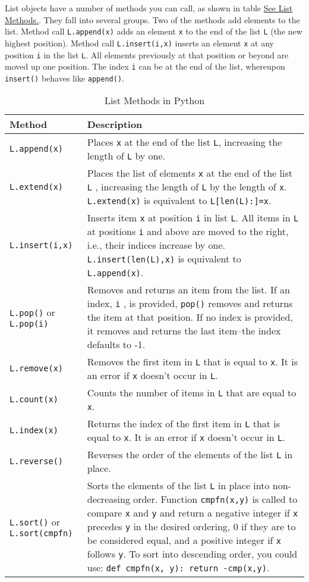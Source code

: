 List objects have a number of
methods you can call, as shown in table \href{chap2.html\#20881}{See List
Methods.}. They fall into several groups. Two of the methods add
elements to the list. Method call \texttt{L.append(x)} adds an element
\texttt{x} to the end of the list \texttt{L} (the new highest position).
Method call \texttt{L.insert(i,x)} inserts an element \texttt{x} at any
position \texttt{i} in the list \texttt{L}. All elements previously at that
position or beyond are moved up one position. The index \texttt{i} can be
at the end of the list, whereupon \texttt{insert()} behaves like
\texttt{append()}.


\begin{longtable}{l|p{7cm}}
\caption{List Methods in Python}
\label{table:list-methods-python}\\
%
\toprule
Method & Description \\
%
\midrule
\verb"L.append(x)" & Places \texttt{x} at the end of the list \texttt{L}, increasing the length of \texttt{L} by one. \\
%
\verb"L.extend(x)" & Places the list of elements \verb"x" at the end of the list \verb"L" , increasing the length of \verb"L" by the length of \verb"x". \verb"L.extend(x)" is equivalent to \verb"L[len(L):]=x". \\
%
\verb"L.insert(i,x)" &  Inserts item \texttt{x} at position \texttt{i} in list \texttt{L}.
All items in \texttt{L} at positions \texttt{i} and above are moved to the right, i.e., their indices increase by one.
\texttt{L.insert(len(L),x)} is equivalent to \texttt{L.append(x)}. \\
%
\verb"L.pop()" or \verb"L.pop(i)" &  Removes and returns an item from the list. If an index, \texttt{i} , is provided, \texttt{pop()} removes and returns the item at that position. If no index is provided, it removes and returns the last item--the index defaults to -1. \\
%
\verb"L.remove(x)" & Removes the first item in \texttt{L} that is equal to \texttt{x}. It is an error if \texttt{x} doesn't occur in \texttt{L}. \\ 
%
\verb"L.count(x)" & Counts the number of items in \texttt{L} that are equal to \texttt{x}. \\
\verb"L.index(x)" & Returns the index of the first item in \texttt{L} that is equal to \texttt{x}. It is an error if \texttt{x} doesn't occur in \texttt{L}. \\
%
\verb"L.reverse()" & Reverses the order of the elements of the list \texttt{L} in place. \\
%
\verb"L.sort()" or \verb"L.sort(cmpfn)" & Sorts the elements of the list  \texttt{L} in place into non- decreasing order. Function \texttt{cmpfn(x,y)} is called to compare \texttt{x} and \texttt{y} and return a negative integer  if \texttt{x} precedes \texttt{y} in the desired ordering, 0 if they are to  be considered equal, and a positive integer if \texttt{x} follows \texttt{y}. To sort into descending order, you could use: \verb"def cmpfn(x, y): return -cmp(x,y)". \\
\bottomrule
\end{longtable}
    
